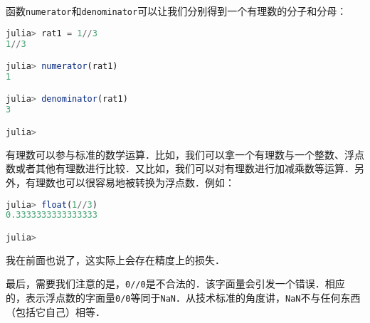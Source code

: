 函数\verb|numerator|和\verb|denominator|可以让我们分别得到一个有理数的分子和分母：
\begin{lstlisting}[language=julia]
julia> rat1 = 1//3
1//3

julia> numerator(rat1)
1

julia> denominator(rat1)
3

julia>  
\end{lstlisting}

有理数可以参与标准的数学运算．比如，我们可以拿一个有理数与一个整数、浮点数或者其他有理数进行比较．又比如，我们可以对有理数进行加减乘数等运算．另外，有理数也可以很容易地被转换为浮点数．例如：
\begin{lstlisting}[language=julia]
julia> float(1//3) 
0.3333333333333333

julia> 
\end{lstlisting}

我在前面也说了，这实际上会存在精度上的损失．

最后，需要我们注意的是，\verb|0//0|是不合法的．该字面量会引发一个错误．相应的，表示浮点数的字面量\verb|0/0|等同于\verb|NaN|．从技术标准的角度讲，\verb|NaN|不与任何东西（包括它自己）相等．